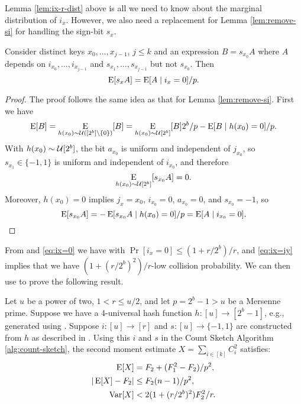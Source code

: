 Lemma \ref{lem:ix-r-dist} above is all we need to know about the marginal distribution of $i_x$.
However, we also need a replacement for Lemma \ref{lem:remove-si} for handling the sign-bit $s_x$.
\begin{lemma}
   \label{lem:remove-si-r-dist}
   Consider distinct keys $x_0,\ldots,x_{j - 1}$, $j\leq k$ and an expression $B=s_{x_0}A$ where $A$ depends on $i_{x_0},\ldots,i_{x_{j - 1}}$ and $s_{x_1},\ldots,s_{x_{j - 1}}$ but not $s_{x_0}$.
   Then
   \begin{equation}
      \label{eq:remove-si-r-dist} \operatorname*{E}[s_xA]=\operatorname*{E}[A \mid i_x=0]/p.
   \end{equation}
\end{lemma}
\begin{proof}
   The proof follows the same idea as that for Lemma \ref{lem:remove-si}.
   First we have \[\operatorname*{E}[B]=\operatorname*{E}_{h(x_0) \sim \mathcal{U}([2^b]\setminus\{0\})}[B]=\operatorname*{E}_{h(x_0) \sim \mathcal{U}[2^b]}[B]2^b/p-\operatorname*{E}[B \mid h(x_0)=0]/p.
   \]
   With $h(x_0)\sim \mathcal{U}[2^b]$, the bit $a_{x_0}$ is uniform and
   independent of $j_{x_0}$, so $s_{x_1}\in\{-1,1\}$ is uniform and
   independent of $i_{x_0}$, and therefore
   \[\operatorname*{E}_{h(x_0) \sim \mathcal{U}[2^b]}[s_{x_0}
         A]=0.
   \]
   Moreover, $h(x_0)=0$ implies $j_x={x_0}$, $i_{x_0}=0$, $a_{x_0}=0$,
   and $s_{x_0}=-1$,
   so
   \[\operatorname*{E}[s_{x_0}
         A]=-\operatorname*{E}[s_{x_0}A \mid h(x_0)=0]/p=\operatorname*{E}[A \mid i_{x_0}=0].
   \]
\end{proof}

From  and \eqref{eq:ix=0} we have  with $\Pr[i_x = 0] \le (1 + r/2^b)/r$, and \eqref{eq:ix=iy} implies that we have $(1 + (r/2^b)^2)/r$-low collision probability.
We can then use  to prove the following result.
\begin{theorem}
   \label{thm:h-and-s-p-arb-r}
   Let $u$ be a power of two, $1 < r \le u/2$, and let $p=2^b-1>u$ be a Mersenne prime.
   Suppose we have a 4-universal hash function $h:[u]\to[2^b-1]$, e.g., generated using .
   Suppose $i:[u]\to[r]$ and $s:[u]\to\{-1,1\}$ are constructed from $h$ as described in .
   Using this $i$ and $s$ in the Count Sketch Algorithm \ref{alg:count-sketch}, the second moment estimate $X=\sum_{i\in[k]} C_i^2$ satisfies:
   \begin{align}
      \operatorname*{E}[X] & = F_2+(F_1^2-F_2)/p^2, \label{eq:E-F2-p-arb-r} \\ | \operatorname*{E}[X] - F_2 | & \le F_2 (n - 1)/p^2, \label{eq:E-F2-p-com-arb-r}\\ \operatorname*{Var}[X] & < 2(1 + (r/2^b)^2)F_2^2/r.
      \label{eq:V-F2-p-arb-r}
   \end{align}
\end{theorem}

